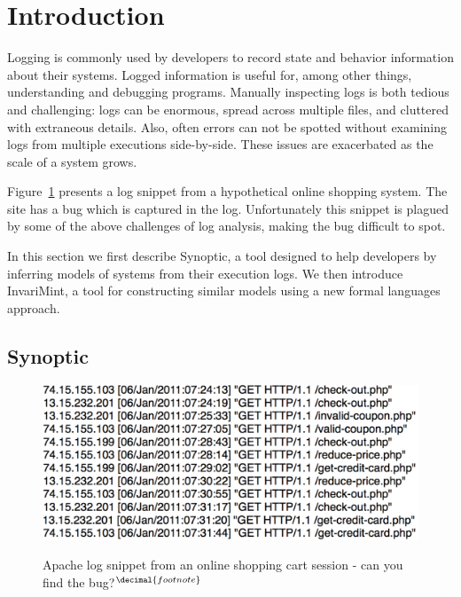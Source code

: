 \section{Introduction}
\label{sec:introduction}

Logging is commonly used by developers to record state and behavior information 
about their systems. Logged information is useful for, among other things,
understanding and debugging programs.
Manually inspecting logs is
both tedious and challenging: logs can be enormous, spread across
multiple files, and cluttered with extraneous details. Also, often errors can
not be spotted without examining logs from multiple executions
side-by-side. These issues are exacerbated as the scale of a system grows. 

Figure~\ref{fig:motivating-log} presents a log snippet from a hypothetical
online shopping system. The site has a bug 
which is captured in the log. Unfortunately this snippet is plagued by some of the above
challenges of log analysis, making the bug difficult to spot.

In this section we first describe Synoptic, a tool designed to help developers
by inferring models of systems from their execution logs. We then introduce 
InvariMint, a tool for constructing similar models using a new 
formal languages approach.

\subsection{Synoptic}
\label{sec:synoptic}

\addtocounter{footnote}{1}
\begin{figure}[t!]
   \center
   {\includegraphics[width=0.95\columnwidth]{fig/motivating-log.pdf}}
   \smallskip
   \caption{Apache log snippet from an online shopping cart session - can you
   find the bug?$^{\decimal{footnote}}$}
   \label{fig:motivating-log}
\end{figure}

